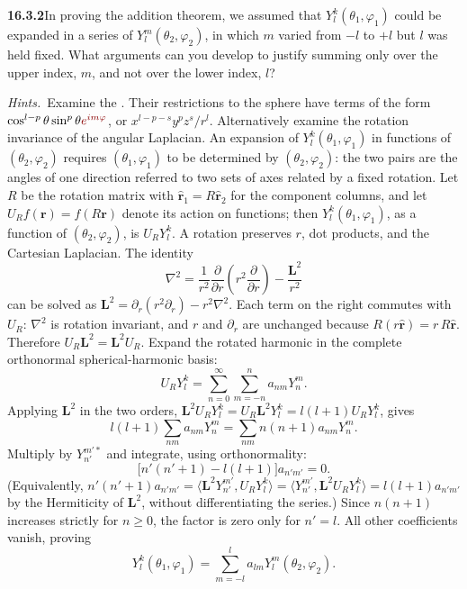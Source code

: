 \par\bigskip
\noindent\textbf{16.3.2}\quad In proving the addition theorem, we
assumed that $Y_{l}^{k}(\theta_{1},\varphi_{1})$ could be expanded in
a series of $Y_{l}^{m}(\theta_{2},\varphi_{2})$, in which $m$ varied
from $-l$ to $+l$ but $l$ was held fixed. What arguments can you
develop to justify summing only over the upper index, $m$, and not
over the lower index, $l$?
\par\emph{Hints.}~Examine the . Their restrictions to the sphere have terms
of the form $\cos^{l-p}\theta\sin^p\theta\erratum{e^{im\varphi}}$,
or $x^{l-p-s}y^pz^s/r^l$. Alternatively examine the rotation
invariance of the angular Laplacian. 
\solution
An expansion of $Y_l^k(\theta_1,\varphi_1)$ in functions of
$(\theta_2,\varphi_2)$ requires $(\theta_1,\varphi_1)$ to be determined
by $(\theta_2,\varphi_2)$: the two pairs are the angles of one direction
referred to two sets of axes related by a fixed rotation. Let $R$ be
the rotation matrix with $\hat{\mathbf r}_1=R\hat{\mathbf r}_2$ for the
component columns, and let $U_Rf(\mathbf r)=f(R\mathbf r)$ denote its
action on functions; then $Y_l^k(\theta_1,\varphi_1)$, as a function
of $(\theta_2,\varphi_2)$, is $U_RY_l^k$. A rotation
preserves $r$, dot products, and the Cartesian Laplacian. The identity
\[
\nabla^2=\frac1{r^2}\frac{\partial}{\partial r}
\left(r^2\frac{\partial}{\partial r}\right)-\frac{\mathbf L^2}{r^2}
\]
can be solved as
$\mathbf L^2=\partial_r(r^2\partial_r)-r^2\nabla^2$. Each term on the
right commutes with $U_R$: $\nabla^2$ is rotation invariant, and
$r$ and $\partial_r$ are unchanged because $R(r\hat{\mathbf r})
=r\,R\hat{\mathbf r}$. Therefore $U_R\mathbf L^2=\mathbf L^2U_R$. Expand the
rotated harmonic in the complete orthonormal spherical-harmonic basis:
\[
U_RY_l^k=\sum_{n=0}^{\infty}\sum_{m=-n}^{n}a_{nm}Y_n^m.
\]
Applying $\mathbf L^2$ in the two orders, $\mathbf L^2U_RY_l^k
=U_R\mathbf L^2Y_l^k=l(l+1)U_RY_l^k$, gives
\[
l(l+1)\sum_{nm}a_{nm}Y_n^m
=\sum_{nm}n(n+1)a_{nm}Y_n^m.
\]
Multiply by $Y_{n'}^{m'*}$ and integrate, using orthonormality:
\[
\big[n'(n'+1)-l(l+1)\big]a_{n'm'}=0.
\]
(Equivalently, $n'(n'+1)a_{n'm'}=\langle\mathbf L^2Y_{n'}^{m'},U_RY_l^k\rangle
=\langle Y_{n'}^{m'},\mathbf L^2U_RY_l^k\rangle=l(l+1)a_{n'm'}$ by the
Hermiticity of $\mathbf L^2$, without differentiating the series.)
Since $n(n+1)$ increases strictly for $n\ge0$, the factor is zero only
for $n'=l$.
All other coefficients vanish, proving
\[
\boxed{Y_l^k(\theta_1,\varphi_1)
=\sum_{m=-l}^{l}a_{lm}Y_l^m(\theta_2,\varphi_2)}.
\]

